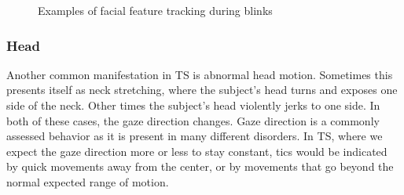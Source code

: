 \documentclass[11pt]{article}
\begin{document}
\begin{figure}%
    \centering
    \qquad
    \caption{Examples of facial feature tracking during blinks}%
    \label{ticgraph}%
\end{figure}

\subsubsection{Head}
Another common manifestation in TS is abnormal head motion. Sometimes this presents itself as neck stretching, where the subject's head turns and exposes one side of the neck. Other times the subject's head violently jerks to one side. In both of these cases, the gaze direction changes. Gaze direction is a commonly assessed behavior as it is present in many different disorders. In TS, where we expect the gaze direction more or less to stay constant, tics would be indicated by quick movements away from the center,  or by movements that go beyond the normal expected range of motion.
\end{document}

